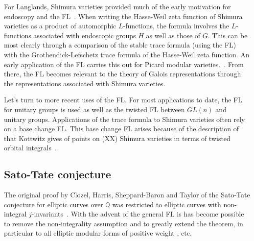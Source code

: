 \documentclass[brochure,english,12pt]{bourbaki}
\newcommand{\ring}[1]{\mathbb{#1}}
\begin{document}
For Langlands, Shimura varieties provided much of the early motivation
for endoscopy and the FL~\cite{LZ:1979}.  When writing the 
Hasse-Weil zeta function of Shimura varieties as a product of
automorphic $L$-functions, the formula involves the $L$-functions
associated with endoscopic groups $H$ as well as those of $G$.  This
can be most clearly through a comparison of the stable trace formula (using the FL)
with the Grothendick-Lefschetz trace formula of the Hasse-Weil zeta
function.
An early application of the FL carries this out for
Picard modular
varieties.~\cite{LPicard:1992}.  From there, the FL becomes relevant to the theory of Galois representations
through the representations associated with Shimura varieties.

Let's turn to more recent uses of the FL.  
For most applications to
date, the FL for unitary groups is used as well as the twisted FL
between $GL(n)$ and unitary groups.  Applications of the trace formula
to Shimura varieties often rely on a base change FL.  This base change FL arises
because of the description of that Kottwitz gives of points on (XX)
Shimura varieties in terms of twisted orbital
integrals~\cite{Kott:1990}.




\subsection{Sato-Tate conjecture}

The original proof by Clozel, Harris, Sheppard-Baron and Taylor
of the Sato-Tate conjecture for elliptic curves over
$\ring{Q}$ was restricted to elliptic curves with non-integral
$j$-invariants~\cite{XX}.
With the advent of the general FL is has become possible to remove
the non-integrality assumption and to greatly extend the theorem, in particular 
to all elliptic modular forms of positive weight \cite{BGHT:2010}, etc.


\end{document}
